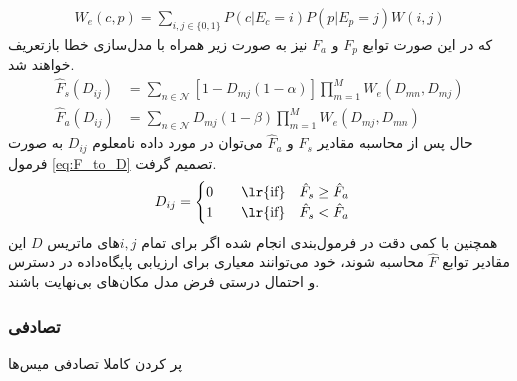 \begin{equation}
	\begin{aligned}
		W_e(c,p) = \sum_{i,j \in \{0,1\}} P(c|E_c=i)P(p|E_p=j)W(i,j)
	\end{aligned}
	\label{eq:W_e}
\end{equation}
که در این صورت توابع $F_p$ و $F_a$ نیز به صورت زیر همراه با مدل‌سازی خطا بازتعریف خواهند شد.
\begin{equation}
	\begin{aligned}
		\hat{F}_s(D_{ij}) &= \sum_{n \in \mathcal{N}}  [1-D_{mj}(1-\alpha)]  \prod_{m=1}^{M} W_e(D_{mn}, D_{mj}) \\
		\hat{F}_a(D_{ij}) &= \sum_{n \in \mathcal{N}}  D_{mj}(1-\beta)  \prod_{m=1}^{M} W_e(D_{mj}, D_{mn})
	\end{aligned}
	\label{eq:F_all_final}
\end{equation}
حال پس از محاسبه مقادیر $\hat{F}_s$ و $\hat{F}_a$ می‌توان در مورد داده نامعلوم $D_{ij}$  به صورت فرمول \ref{eq:F_to_D} تصمیم گرفت.
\begin{equation}
	D_{ij} = \begin{cases}
		0 \qquad \text{\lr{if}} \quad \hat{F}_s \ge \hat{F}_a \\
		1 \qquad \text{\lr{if}} \quad \hat{F}_s < \hat{F}_a
	\end{cases}
	\label{eq:F_to_D}
\end{equation}
همچنین با کمی دقت در فرمول‌بندی انجام شده اگر برای تمام $i,j$های ماتریس $D$ این مقادیر توابع $\hat{F}$ محاسبه شوند، خود می‌توانند معیاری برای ارزیابی پایگاه‌داده در دسترس و احتمال درستی فرض مدل مکان‌های بی‌نهایت باشند.



\subsubsection{تصادفی}
پر کردن کاملا تصادفی میس‌ها


	
	
